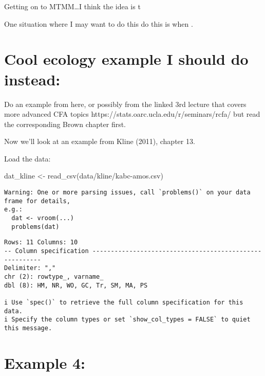 \documentclass[
  letterpaper,
  DIV=11,
  numbers=noendperiod]{scrreprt}
\newenvironment{Shaded}{\begin{snugshade}}{\end{snugshade}}
\newcommand{\FunctionTok}[1]{\textcolor[rgb]{0.28,0.35,0.67}{#1}}
\newcommand{\NormalTok}[1]{\textcolor[rgb]{0.00,0.23,0.31}{#1}}
\newcommand{\OtherTok}[1]{\textcolor[rgb]{0.00,0.23,0.31}{#1}}
\newcommand{\StringTok}[1]{\textcolor[rgb]{0.13,0.47,0.30}{#1}}
\begin{document}
Getting on to MTMM\ldots I think the idea is t

One situation where I may want to do this do this is when .

\hypertarget{cool-ecology-example-i-should-do-instead}{%
\section*{Cool ecology example I should do
instead:}\label{cool-ecology-example-i-should-do-instead}}


Do an example from here, or possibly from the linked 3rd lecture that
covers more advanced CFA topics
https://stats.oarc.ucla.edu/r/seminars/rcfa/ but read the corresponding
Brown chapter first.

Now we'll look at an example from Kline (2011), chapter 13.

Load the data:

\begin{Shaded}
\begin{Highlighting}[]
\NormalTok{dat\_kline }\OtherTok{\textless{}{-}} \FunctionTok{read\_csv}\NormalTok{(}\StringTok{\textquotesingle{}data/kline/kabc{-}amos.csv\textquotesingle{}}\NormalTok{)}
\end{Highlighting}
\end{Shaded}

\begin{verbatim}
Warning: One or more parsing issues, call `problems()` on your data frame for details,
e.g.:
  dat <- vroom(...)
  problems(dat)
\end{verbatim}

\begin{verbatim}
Rows: 11 Columns: 10
-- Column specification --------------------------------------------------------
Delimiter: ","
chr (2): rowtype_, varname_
dbl (8): HM, NR, WO, GC, Tr, SM, MA, PS

i Use `spec()` to retrieve the full column specification for this data.
i Specify the column types or set `show_col_types = FALSE` to quiet this message.
\end{verbatim}

\hypertarget{example-4}{%
\section{Example 4:}\label{example-4}}
\end{document}
